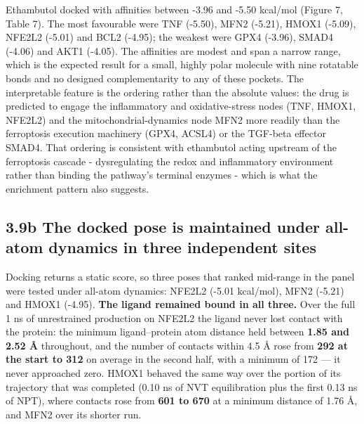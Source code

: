 \documentclass[utf8]{FrontiersinVancouver}
\begin{document}
Ethambutol docked with affinities between -3.96 and -5.50 kcal/mol (Figure 7, Table 7). The most favourable were TNF (-5.50), MFN2 (-5.21), HMOX1 (-5.09), NFE2L2 (-5.01) and BCL2 (-4.95); the weakest were GPX4 (-3.96), SMAD4 (-4.06) and AKT1 (-4.05). The affinities are modest and span a narrow range, which is the expected result for a small, highly polar molecule with nine rotatable bonds and no designed complementarity to any of these pockets. The interpretable feature is the ordering rather than the absolute values: the drug is predicted to engage the inflammatory and oxidative-stress nodes (TNF, HMOX1, NFE2L2) and the mitochondrial-dynamics node MFN2 more readily than the ferroptosis execution machinery (GPX4, ACSL4) or the TGF-beta effector SMAD4. That ordering is consistent with ethambutol acting upstream of the ferroptosis cascade - dysregulating the redox and inflammatory environment rather than binding the pathway's terminal enzymes - which is what the enrichment pattern also suggests.

\subsection{3.9b The docked pose is maintained under all-atom dynamics in three independent sites}

Docking returns a static score, so three poses that ranked mid-range in the panel were tested under all-atom dynamics: NFE2L2 (-5.01 kcal/mol), MFN2 (-5.21) and HMOX1 (-4.95). \textbf{The ligand remained bound in all three.} Over the full 1 ns of unrestrained production on NFE2L2 the ligand never lost contact with the protein: the minimum ligand--protein atom distance held between \textbf{1.85 and 2.52 \AA{}} throughout, and the number of contacts within 4.5 \AA{} rose from \textbf{292 at the start to 312} on average in the second half, with a minimum of 172 --- it never approached zero. HMOX1 behaved the same way over the portion of its trajectory that was completed (0.10 ns of NVT equilibration plus the first 0.13 ns of NPT), where contacts rose from \textbf{601 to 670} at a minimum distance of 1.76 \AA{}, and MFN2 over its shorter run.
\end{document}
